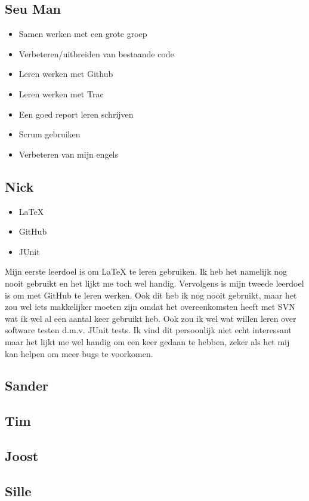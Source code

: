 \documentclass{article}
\begin{document}
\subsection*{Seu Man}
\begin{itemize}
	\item Samen werken met een grote groep
	\item Verbeteren/uitbreiden van bestaande code
	\item Leren werken met Github
	\item Leren werken met Trac
	\item Een goed report leren schrijven
	\item Scrum gebruiken
	\item Verbeteren van mijn engels
\end{itemize}

\subsection*{Nick}
\begin{itemize}
	\item \LaTeX
	\item GitHub
	\item JUnit
\end{itemize} 
Mijn eerste leerdoel is om \LaTeX{} te leren gebruiken. Ik heb het namelijk nog nooit gebruikt en het lijkt me toch wel handig. Vervolgens is mijn tweede leerdoel is om met GitHub te leren werken. Ook dit heb ik nog nooit gebruikt,  maar het zou wel iets makkelijker moeten zijn omdat het overeenkomsten heeft met SVN wat ik wel al
een aantal keer gebruikt heb. Ook zou ik wel wat willen leren over software testen d.m.v. JUnit tests. Ik vind dit persoonlijk niet echt interessant maar het lijkt me wel handig om een keer gedaan te hebben, zeker als het mij kan helpen om  meer bugs te voorkomen.
\subsection*{Sander}
\subsection*{Tim}
\subsection*{Joost}
\subsection*{Sille}
\end{document}
